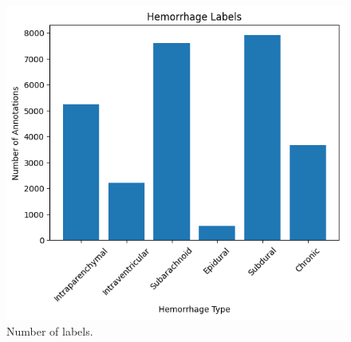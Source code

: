 \documentclass[Print]{../Style/isecure-v24}
\begin{document}
\newpage
\twocolumn

{\begin{figure}[h]
    \centering
    \includegraphics[width=1.0\linewidth]{ISeCure Draft/Images/output.png}
    \captionsetup{font=small}
    \caption{Number of labels.}
    \label{fig:label-count}
\end{figure}}
\end{document}
